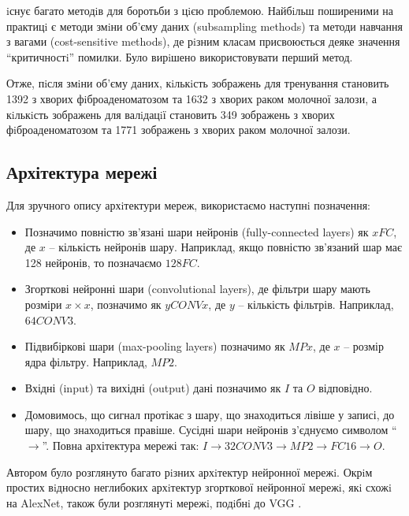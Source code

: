 iснує багато методiв для боротьби з цiєю проблемою. Найбiльш поширеними на практицi є методи змiни об'єму даних (subsampling methods) та методи навчання з вагами (cost-sensitive methods), де рiзним класам присвоюється деяке значення \enquote{критичностi} помилки. Було вирiшено використовувати перший метод.

Отже, пiсля змiни об'єму даних, кiлькiсть зображень для тренування становить 1392 з хворих фiброаденоматозом та 1632 з хворих раком молочної залози, а кiлькiсть зображень для валiдацiї становить 349 зображень з хворих фiброаденоматозом та 1771 зображень з хворих раком молочної залози.

\subsection{Архітектура мережі}

Для зручного опису архiтектури мереж, використаємо наступнi позначення:

\begin{itemize}
	\item Позначимо повністю зв'язані шари нейронів (fully-connected layers) як \(xFC\), де \(x\) -- кількість нейронів шару. Наприклад, якщо повністю зв'язаний шар має 128 нейронів, то позначаємо \(128FC\).
	
	\item Згорткові нейронні шари (convolutional layers), де фільтри шару мають розміри \(x \times x\), позначимо як \(yCONVx\), де \(y\) -- кількість фільтрів. Наприклад, \(64CONV3\).
	
	\item Підвибіркові шари (max-pooling layers) позначимо як \(MPx\), де \(x\) -- розмір ядра фільтру. Наприклад, \(MP2\).
	
	\item Вхідні (input) та вихідні (output) дані позначимо як \(I\) та \(O\) відповідно.
	
	\item Домовимось, що сигнал протікає з шару, що знаходиться лівіше у записі, до шару, що знаходиться правіше. Сусідні шари нейронів з'єднуємо символом \enquote{\(\rightarrow\)}. Повна архітектура мережі так: \(I \rightarrow 32CONV3 \rightarrow MP2 \rightarrow FC16 \rightarrow O\).
\end{itemize}

Автором було розглянуто багато рiзних архiтектур нейронної мережi. Окрiм простих вiдносно неглибоких архiтектур згорткової нейронної мережi, якi схожi на AlexNet, також були розглянутi мережi, подiбнi до VGG \cite{nn:vgg}.

